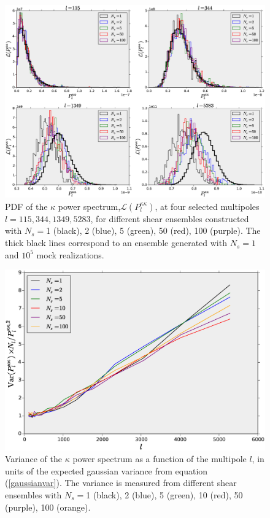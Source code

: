 \documentclass[reprint,aps,prd,superscriptaddress,showkeys,showpacs]{revtex4-1}
\begin{document}
\begin{figure}
\includegraphics[scale=0.4]{Figures/ps_pdf.eps}
\caption{PDF of the $\kappa$ power spectrum,$\mathcal{L}(P_l^{\kappa\kappa})$, at four selected multipoles $l=115,344,1349,5283$, for different shear ensembles constructed with $N_s=$1 (black), 2 (blue), 5 (green), 50 (red), 100 (purple). The thick black lines correspond to an ensemble generated with $N_s=1$ and $10^5$ mock realizations.}
\label{ps_pdf}
\end{figure}

\begin{figure}
\includegraphics[scale=0.3]{Figures/ps_variance.eps}
\caption{Variance of the $\kappa$ power spectrum as a function of the multipole $l$, in units of the expected gaussian variance from equation (\ref{gaussianvar}). The variance is measured from different shear ensembles with $N_s=$1 (black), 2 (blue), 5 (green), 10 (red), 50 (purple), 100 (orange). }
\label{ps_var}
\end{figure}
\end{document}
